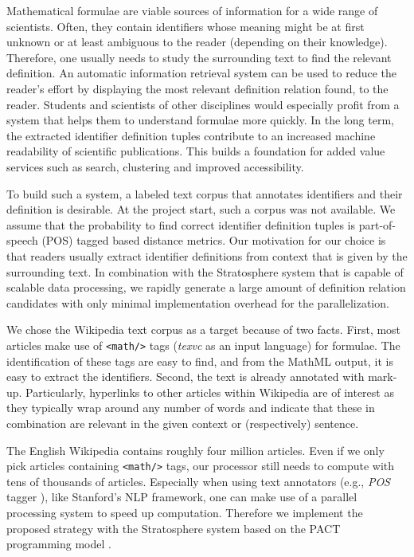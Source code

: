 \documentclass[runningheads]{llncs}
\begin{document}
Mathematical formulae are viable sources of information for a wide range of
scientists. Often, they contain identifiers whose meaning might be at first
unknown or at least ambiguous to the reader (depending on their knowledge).
Therefore, one usually needs to study the surrounding text to find the
relevant definition. An automatic information retrieval system can be used to
reduce the reader's effort by displaying the most relevant definition relation
found, to the reader. Students and scientists of other disciplines would
especially profit from a system that helps them to understand formulae more
quickly. In the long term, the extracted identifier definition tuples contribute
to an increased machine readability of scientific publications. This builds a 
foundation for added value services such as search, clustering and improved
accessibility.


To build such a system, a labeled text corpus that annotates identifiers and
their definition is desirable. At the project start, such a corpus was not
available. 
We assume that the probability to find correct identifier definition tuples is
part-of-speech (POS) tagged based distance metrics.
Our motivation for our choice is that readers usually extract identifier 
definitions from context that is given by the surrounding text.
In combination with the Stratosphere system 
that is capable of scalable data processing,  we rapidly generate a large
amount of definition relation candidates with only minimal implementation
overhead for the parallelization.


We chose the Wikipedia text corpus as a target because of two facts. First,
most articles make use of \texttt{<math/>} tags (\emph{texvc} as an input
language) for formulae.  The identification of these tags are easy to find, 
and from the MathML output, it is easy to extract the identifiers.
Second, the text is already annotated with mark-up.
Particularly, hyperlinks to other articles within Wikipedia are of
interest as they typically wrap around any number of words and indicate that
these in combination are relevant in the given context or (respectively) sentence.


The English Wikipedia contains roughly four million articles. Even if we only
pick articles containing \texttt{<math/>} tags, our processor still needs to
compute with tens of thousands of articles. Especially when using text
annotators (e.g., \emph{POS} tagger \cite{Rathna96}), like Stanford's NLP
framework, one can make use of a parallel processing system to speed up
computation. Therefore we implement the proposed strategy with the
Stratosphere system based on the PACT programming model \cite{Alexandrov2010}.
\end{document}
